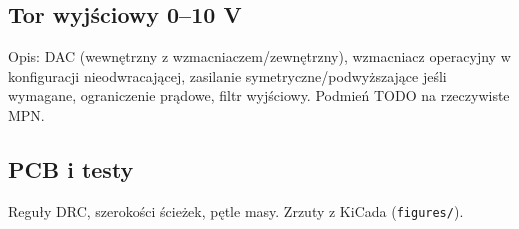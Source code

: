 \subsection{Tor wyjściowy 0–10 V}
Opis: DAC (wewnętrzny z wzmacniaczem/zewnętrzny), wzmacniacz operacyjny w konfiguracji nieodwracającej,
zasilanie symetryczne/podwyższające jeśli wymagane, ograniczenie prądowe, filtr wyjściowy. Podmień TODO na rzeczywiste MPN.


\subsection{PCB i testy}
Reguły DRC, szerokości ścieżek, pętle masy. Zrzuty z KiCada (\texttt{figures/}).